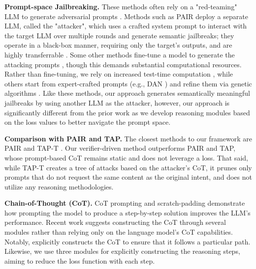 \noindent \textbf{Prompt-space Jailbreaking.} These methods often rely on a "red-teaming" LLM to generate adversarial prompts \cite{perez2022redteaminglanguagemodels,wei2023jailbrokendoesllmsafety,sadasivan2024fastadversarialattackslanguage,chao2024jailbreakingblackboxlarge,liu2024autodangeneratingstealthyjailbreak,mehrotra2024treeattacksjailbreakingblackbox,zeng2024johnnypersuadellmsjailbreak,samvelyan2024rainbowteamingopenendedgeneration, liu2024autodanturbolifelongagentstrategy}. 
Methods such as PAIR \cite{chao2024jailbreakingblackboxlarge} deploy a separate LLM, called the "attacker", which uses a crafted system prompt to interact with the target LLM over multiple rounds and generate semantic jailbreaks; they operate in a black-box manner, requiring only the target’s outputs, and are highly transferrable \cite{chao2024jailbreakingblackboxlarge}.
Some other methods fine-tune a model to generate the attacking prompts \cite{perez2022redteaminglanguagemodels,ge2023martimprovingllmsafety,zeng2024johnnypersuadellmsjailbreak,paulus2024advprompterfastadaptiveadversarial,beetham2024liarleveragingalignmentbestofn}, though this demands substantial computational resources. Rather than fine-tuning, we rely on increased test-time computation \cite{snell2024scalingllmtesttimecompute}, while others start from expert-crafted prompts (e.g., DAN \cite{ChatGPTDAN2024}) and refine them via genetic algorithms \cite{liu2024autodangeneratingstealthyjailbreak,samvelyan2024rainbowteamingopenendedgeneration,lapid2024opensesameuniversalblack}. Like these methods, our approach generates semantically meaningful jailbreaks by using another LLM as the attacker, however, our approach is significantly different from the prior work as we develop reasoning modules based on the loss values to better navigate the prompt space.

\noindent \textbf{Comparison with PAIR and TAP.} The closest methods to our framework are PAIR \cite{chao2024jailbreakingblackboxlarge} and TAP-T \cite{mehrotra2024treeattacksjailbreakingblackbox}. Our verifier-driven method outperforms PAIR and TAP, whose prompt-based CoT remains static and does not leverage a loss. That said, while TAP-T creates a tree of attacks based on the attacker's CoT, it prunes only prompts that do not request the same content as the original intent, and does not utilize any reasoning methodologies. 


\noindent \textbf{Chain-of-Thought (CoT).} CoT prompting \cite{wei2023chainofthoughtpromptingelicitsreasoning} and scratch-padding \cite{nye2021workscratchpadsintermediatecomputation} demonstrate how prompting the model to produce a step-by-step solution improves the LLM's performance. Recent work \cite{zheng2024criticcotboostingreasoningabilities,wang2024strategicchainofthoughtguidingaccurate,xiang20252reasoningllmslearning} suggests constructing the CoT through several modules rather than relying only on the language model's CoT capabilities. Notably,  \cite{xiang20252reasoningllmslearning} explicitly constructs the CoT to ensure that it follows a particular path. Likewise, we use three modules for explicitly constructing the reasoning steps, aiming to reduce the loss function with each step.

